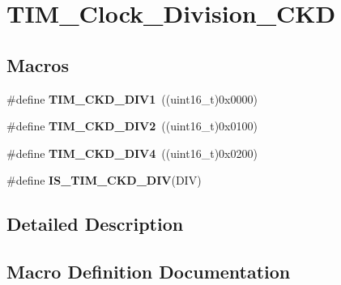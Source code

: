 \hypertarget{group___t_i_m___clock___division___c_k_d}{}\section{T\+I\+M\+\_\+\+Clock\+\_\+\+Division\+\_\+\+C\+K\+D}
\label{group___t_i_m___clock___division___c_k_d}
\subsection*{Macros}
\begin{DoxyCompactItemize}
\item 
\hypertarget{group___t_i_m___clock___division___c_k_d_ga88691a07b3976791977d280045b3c850}{}\#define {\bfseries T\+I\+M\+\_\+\+C\+K\+D\+\_\+\+D\+I\+V1}~((uint16\+\_\+t)0x0000)\label{group___t_i_m___clock___division___c_k_d_ga88691a07b3976791977d280045b3c850}

\item 
\hypertarget{group___t_i_m___clock___division___c_k_d_ga46a5fd6a173a7e88528a6e4084a08665}{}\#define {\bfseries T\+I\+M\+\_\+\+C\+K\+D\+\_\+\+D\+I\+V2}~((uint16\+\_\+t)0x0100)\label{group___t_i_m___clock___division___c_k_d_ga46a5fd6a173a7e88528a6e4084a08665}

\item 
\hypertarget{group___t_i_m___clock___division___c_k_d_gac2e5c030f964f9b4c92fa8129fb923bc}{}\#define {\bfseries T\+I\+M\+\_\+\+C\+K\+D\+\_\+\+D\+I\+V4}~((uint16\+\_\+t)0x0200)\label{group___t_i_m___clock___division___c_k_d_gac2e5c030f964f9b4c92fa8129fb923bc}

\item 
\#define {\bfseries I\+S\+\_\+\+T\+I\+M\+\_\+\+C\+K\+D\+\_\+\+D\+I\+V}(D\+I\+V)
\end{DoxyCompactItemize}


\subsection{Detailed Description}


\subsection{Macro Definition Documentation}
\hypertarget{group___t_i_m___clock___division___c_k_d_ga9298ec9ad2d578a4c54e6c0dd4c03946}{}
